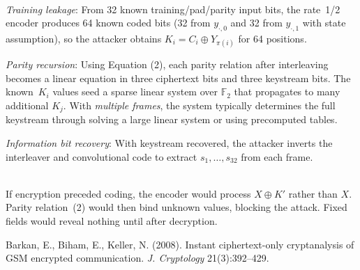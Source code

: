 \begin{technical}
\\[0.5em]
\textit{Training leakage}: From 32 known training/pad/parity input bits, the rate~1/2 encoder produces 64 known coded bits (32 from \(y_{\cdot,0}\) and 32 from \(y_{\cdot,1}\) with state assumption), so the attacker obtains
\(K_i = C_i \oplus Y_{\pi(i)}\) for 64 positions.

\textit{Parity recursion}: Using Equation (2), each parity relation after interleaving becomes a linear equation in three ciphertext bits and three keystream bits. The known~\(K_i\) values seed a sparse linear system over \(\mathbb{F}_2\) that propagates to many additional \(K_j\). With \textit{multiple frames}, the system typically determines the full keystream through solving a large linear system or using precomputed tables.

\textit{Information bit recovery}: With keystream recovered, the attacker inverts
the interleaver and convolutional code to extract \(s_1,\dots,s_{32}\) from each frame.

\\[0.5em]
If encryption preceded coding, the encoder would process \(X \oplus K'\) rather than \(X\).
Parity relation (2) would then bind unknown values, blocking the attack. Fixed
fields would reveal nothing until after decryption.

\techref
{\footnotesize
Barkan, E., Biham, E., Keller, N. (2008). Instant ciphertext-only cryptanalysis of GSM encrypted communication. \textit{J. Cryptology} 21(3):392–429.
}
\end{technical}